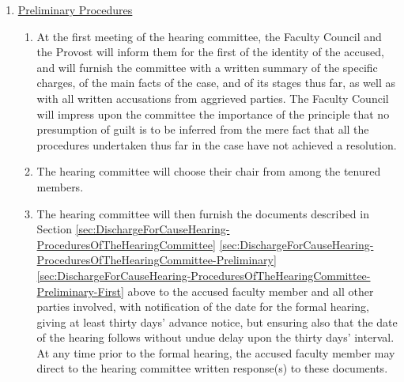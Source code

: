 					\begin{enumerate}[label=\alph*)]
						\item{\underline{Preliminary Procedures}
							\label{sec:DischargeForCauseHearing-ProceduresOfTheHearingCommittee-Preliminary}
							\begin{enumerate}[label=\arabic*)]
								\item{
									\label{sec:DischargeForCauseHearing-ProceduresOfTheHearingCommittee-Preliminary-First}
									At the first meeting of the hearing committee, the Faculty Council and the Provost will inform them for the first of the identity of the accused, and will furnish the committee with a written summary of the specific charges, of the main facts of the case, and of its stages thus far, as well as with all written accusations from aggrieved parties. The Faculty Council will impress upon the committee the importance of the principle that no presumption of guilt is to be inferred from the mere fact that all the procedures undertaken thus far in the case have not achieved a resolution.}
								\item{The hearing committee will choose their chair from among the tenured members.}

								\item{The hearing committee will then furnish the documents described in
									Section
									\ref{sec:DischargeForCauseHearing-ProceduresOfTheHearingCommittee}
									\ref{sec:DischargeForCauseHearing-ProceduresOfTheHearingCommittee-Preliminary}
									\ref{sec:DischargeForCauseHearing-ProceduresOfTheHearingCommittee-Preliminary-First}
									above to the accused faculty member and all other parties involved, with notification of the date for the formal hearing, giving at least thirty days' advance notice, but ensuring also that the date of the hearing follows without undue delay upon the thirty days' interval.  At any time prior to the formal hearing, the accused faculty member may direct to the hearing committee written response(s) to these documents.}


\end{enumerate}}
\end{enumerate}
